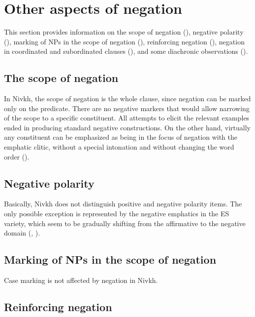 \documentclass[output=paper,colorlinks,citecolor=brown]{langscibook}
\begin{document}
\section{Other aspects of negation}\label{sec:niv:4} 

This section provides information on the scope of negation (), negative polarity (), marking of NPs in the scope of negation (), reinforcing negation (), negation in coordinated and subordinated clauses (), and some diachronic observations ().

\subsection{The scope of negation}\label{sec:niv:4.1} 

In Nivkh, the scope of negation is the whole clause, since negation can be marked only on the predicate. There are no negative markers that would allow narrowing of the scope to a specific constituent. All attempts to elicit the relevant examples ended in producing standard negative constructions. On the other hand, virtually any constituent can be emphasized as being in the focus of negation with the emphatic clitic, without a special intonation and without changing the word order ().

\subsection{Negative polarity}\label{sec:niv:4.2} 

Basically, Nivkh does not distinguish positive and negative polarity items. The only possible exception is represented by the negative emphatics in the ES variety, which seem to be gradually shifting from the affirmative to the negative domain (, ).

\subsection{Marking of NPs in the scope of negation}\label{sec:niv:4.3} 

Case marking is not affected by negation in Nivkh.

\subsection{Reinforcing negation}\label{sec:niv:4.4} 
\end{document}

